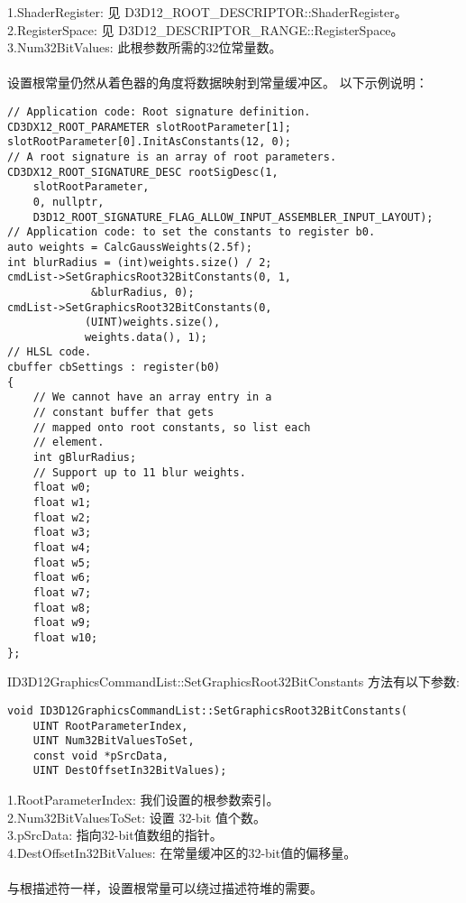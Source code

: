 \begin{flushleft}
1.ShaderRegister: 见 D3D12\_ROOT\_DESCRIPTOR::ShaderRegister。\\
2.RegisterSpace: 见 D3D12\_DESCRIPTOR\_RANGE::RegisterSpace。\\
3.Num32BitValues: 此根参数所需的32位常量数。\\
~\\
设置根常量仍然从着色器的角度将数据映射到常量缓冲区。 以下示例说明：\\
\end{flushleft}

\begin{lstlisting}
// Application code: Root signature definition.
CD3DX12_ROOT_PARAMETER slotRootParameter[1];
slotRootParameter[0].InitAsConstants(12, 0);
// A root signature is an array of root parameters.
CD3DX12_ROOT_SIGNATURE_DESC rootSigDesc(1,
    slotRootParameter,
    0, nullptr,
    D3D12_ROOT_SIGNATURE_FLAG_ALLOW_INPUT_ASSEMBLER_INPUT_LAYOUT);
// Application code: to set the constants to register b0.
auto weights = CalcGaussWeights(2.5f);
int blurRadius = (int)weights.size() / 2;
cmdList->SetGraphicsRoot32BitConstants(0, 1,
             &blurRadius, 0);
cmdList->SetGraphicsRoot32BitConstants(0,
            (UINT)weights.size(), 
            weights.data(), 1);
// HLSL code.
cbuffer cbSettings : register(b0)
{
    // We cannot have an array entry in a 
    // constant buffer that gets
    // mapped onto root constants, so list each 
    // element. 
    int gBlurRadius;
    // Support up to 11 blur weights.
    float w0;
    float w1;
    float w2;
    float w3;
    float w4;
    float w5;
    float w6;
    float w7;
    float w8;
    float w9;
    float w10;
};
\end{lstlisting}

\begin{flushleft}
ID3D12GraphicsCommandList::SetGraphicsRoot32BitConstants 方法有以下参数:\\
\end{flushleft}

\begin{lstlisting}
void ID3D12GraphicsCommandList::SetGraphicsRoot32BitConstants(
    UINT RootParameterIndex,
    UINT Num32BitValuesToSet,
    const void *pSrcData,
    UINT DestOffsetIn32BitValues);
\end{lstlisting}

\begin{flushleft}
1.RootParameterIndex: 我们设置的根参数索引。\\
2.Num32BitValuesToSet: 设置 32-bit 值个数。\\
3.pSrcData: 指向32-bit值数组的指针。\\
4.DestOffsetIn32BitValues: 在常量缓冲区的32-bit值的偏移量。\\
~\\
与根描述符一样，设置根常量可以绕过描述符堆的需要。\\
\end{flushleft}

